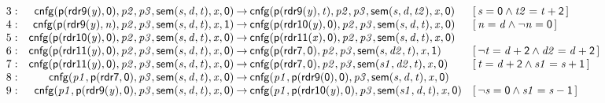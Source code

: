 \documentclass[a4paper]{article}
\newcommand{\symb}[1]{\mathsf{#1}}
\newcommand{\var}[1]{\mathit{#1}}
\newcommand{\Constraint}[1]{[\, #1 \,]}
\begin{document}
\begin{landscape}
\[\begin{array}{rr@{\>}c@{\>}ll}
\mathrm{3} : 
 & \symb{cnfg}(\symb{p}(\symb{rdr9}(\var{y}),\symb{0}),\var{p2},\var{p3},\symb{sem}(\var{s},\var{d},\var{t}),\var{x},\symb{0})
 & \to 
 & \symb{cnfg}(\symb{p}(\symb{rdr9}(\var{y}),\var{t}),\var{p2},\var{p3},\symb{sem}(\var{s},\var{d},\var{t2}),\var{x},\symb{0})
 & \Constraint{\var{s} = \symb{0} \land \var{t2} = \var{t} + \symb{2}}\\

\mathrm{4} : 
 & \symb{cnfg}(\symb{p}(\symb{rdr9}(\var{y}),\var{n}),\var{p2},\var{p3},\symb{sem}(\var{s},\var{d},\var{t}),\var{x},\symb{1})
 & \to 
 & \symb{cnfg}(\symb{p}(\symb{rdr10}(\var{y}),\symb{0}),\var{p2},\var{p3},\symb{sem}(\var{s},\var{d},\var{t}),\var{x},\symb{0})
 & \Constraint{\var{n} = \var{d} \land \neg \var{n} = \symb{0}}\\

\mathrm{5} : 
 & \symb{cnfg}(\symb{p}(\symb{rdr10}(\var{y}),\symb{0}),\var{p2},\var{p3},\symb{sem}(\var{s},\var{d},\var{t}),\var{x},\symb{0})
 & \to 
 & \symb{cnfg}(\symb{p}(\symb{rdr11}(\var{x}),\symb{0}),\var{p2},\var{p3},\symb{sem}(\var{s},\var{d},\var{t}),\var{x},\symb{0})\\

\mathrm{6} : 
 & \symb{cnfg}(\symb{p}(\symb{rdr11}(\var{y}),\symb{0}),\var{p2},\var{p3},\symb{sem}(\var{s},\var{d},\var{t}),\var{x},\symb{0})
 & \to 
 & \symb{cnfg}(\symb{p}(\symb{rdr7},\symb{0}),\var{p2},\var{p3},\symb{sem}(\var{s},\var{d2},\var{t}),\var{x},\symb{1})
 & \Constraint{\neg \var{t} = \var{d} + \symb{2} \land \var{d2} = \var{d} + \symb{2}}\\

\mathrm{7} : 
 & \symb{cnfg}(\symb{p}(\symb{rdr11}(\var{y}),\symb{0}),\var{p2},\var{p3},\symb{sem}(\var{s},\var{d},\var{t}),\var{x},\symb{0})
 & \to 
 & \symb{cnfg}(\symb{p}(\symb{rdr7},\symb{0}),\var{p2},\var{p3},\symb{sem}(\var{s1},\var{d2},\var{t}),\var{x},\symb{0})
 & \Constraint{\var{t} = \var{d} + \symb{2} \land \var{s1} = \var{s} + \symb{1}}\\

\mathrm{8} : 
 & \symb{cnfg}(\var{p1},\symb{p}(\symb{rdr7},\symb{0}),\var{p3},\symb{sem}(\var{s},\var{d},\var{t}),\var{x},\symb{0})
 & \to 
 & \symb{cnfg}(\var{p1},\symb{p}(\symb{rdr9}(\symb{0}),\symb{0}),\var{p3},\symb{sem}(\var{s},\var{d},\var{t}),\var{x},\symb{0})\\

\mathrm{9} : 
 & \symb{cnfg}(\var{p1},\symb{p}(\symb{rdr9}(\var{y}),\symb{0}),\var{p3},\symb{sem}(\var{s},\var{d},\var{t}),\var{x},\symb{0})
 & \to 
 & \symb{cnfg}(\var{p1},\symb{p}(\symb{rdr10}(\var{y}),\symb{0}),\var{p3},\symb{sem}(\var{s1},\var{d},\var{t}),\var{x},\symb{0})
 & \Constraint{\neg \var{s} = \symb{0} \land \var{s1} = \var{s} - \symb{1}}\\


\end{array}\]
\end{landscape}
\end{document}
